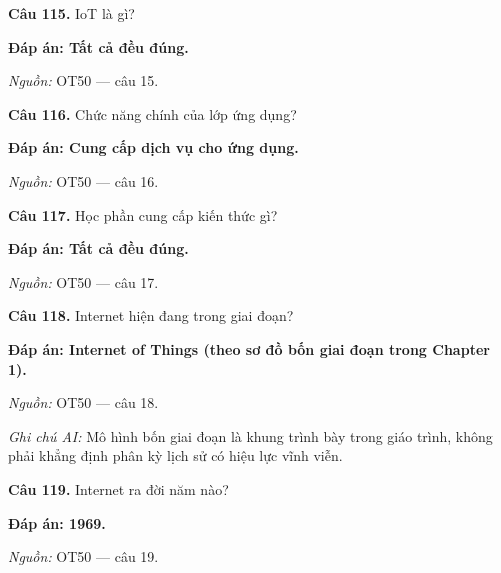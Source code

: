\documentclass[11pt,a4paper]{article}
\begin{document}
\textbf{Câu 115.} IoT là gì?\par
{\color{answer}\textbf{Đáp án: Tất cả đều đúng.}}\par
{\footnotesize\color{sourcegray}\textit{Nguồn:} OT50 — câu 15.\par}
\vspace{3pt}\par\noindent{\color{black!18}\rule{\linewidth}{0.3pt}}\par\medskip

\textbf{Câu 116.} Chức năng chính của lớp ứng dụng?\par
{\color{answer}\textbf{Đáp án: Cung cấp dịch vụ cho ứng dụng.}}\par
{\footnotesize\color{sourcegray}\textit{Nguồn:} OT50 — câu 16.\par}
\vspace{3pt}\par\noindent{\color{black!18}\rule{\linewidth}{0.3pt}}\par\medskip

\textbf{Câu 117.} Học phần cung cấp kiến thức gì?\par
{\color{answer}\textbf{Đáp án: Tất cả đều đúng.}}\par
{\footnotesize\color{sourcegray}\textit{Nguồn:} OT50 — câu 17.\par}
\vspace{3pt}\par\noindent{\color{black!18}\rule{\linewidth}{0.3pt}}\par\medskip

\textbf{Câu 118.} Internet hiện đang trong giai đoạn?\par
{\color{answer}\textbf{Đáp án: Internet of Things (theo sơ đồ bốn giai đoạn trong Chapter 1).}}\par
{\footnotesize\color{sourcegray}\textit{Nguồn:} OT50 — câu 18.\par}
{\footnotesize\color{sourcegray}\textit{Ghi chú AI:} Mô hình bốn giai đoạn là khung trình bày trong giáo trình, không phải khẳng định phân kỳ lịch sử có hiệu lực vĩnh viễn.\par}
\vspace{3pt}\par\noindent{\color{black!18}\rule{\linewidth}{0.3pt}}\par\medskip

\textbf{Câu 119.} Internet ra đời năm nào?\par
{\color{answer}\textbf{Đáp án: 1969.}}\par
{\footnotesize\color{sourcegray}\textit{Nguồn:} OT50 — câu 19.\par}
\vspace{3pt}\par\noindent{\color{black!18}\rule{\linewidth}{0.3pt}}\par\medskip
\end{document}
